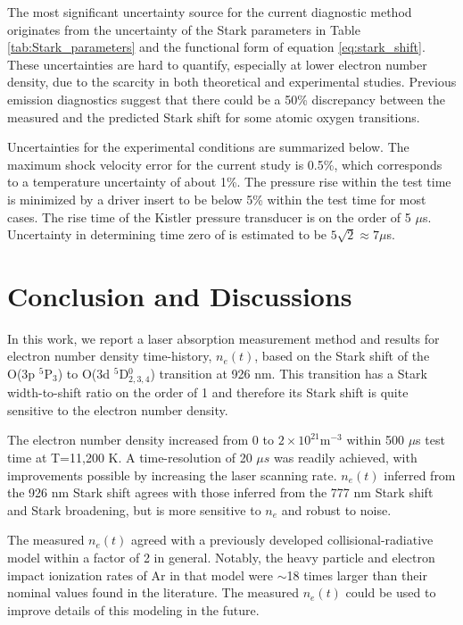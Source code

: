 \documentclass[12pt]{iopart}
\begin{document}
The most significant uncertainty source for the current diagnostic method originates from  the uncertainty of the Stark parameters in Table \ref{tab:Stark_parameters} and the functional form of equation \ref{eq:stark_shift}. These uncertainties are hard to quantify, especially at lower electron number density, due to the scarcity in both theoretical and experimental studies. Previous emission diagnostics suggest that there could be a 50\% discrepancy between the measured and the predicted Stark shift for some atomic oxygen transitions\cite{Baer1993_semiconductor, Goly1987}. 

Uncertainties for the experimental conditions are summarized below. The maximum shock velocity error for the current study is 0.5\%, which corresponds to a temperature uncertainty of about 1\%.  The pressure rise within the test time is minimized by a driver insert to be below 5\% within the test time for most cases. The rise time of the Kistler pressure transducer is on the order of  5 $\mu$s. Uncertainty in  determining time zero of is estimated to be $5\sqrt{2}\approx 7 \mu$s.


\section{Conclusion and Discussions}
In this work, we report a laser absorption measurement method and results for electron number density time-history, $n_e(t)$, based on the Stark shift of the O(3p $^5$P$_{3}$) to O(3d $^5$D$_{2,3,4}^0$) transition at 926 nm. This transition has a Stark width-to-shift ratio on the order of 1 and therefore its Stark shift is quite sensitive to the electron number density. 

The electron number density increased from 0 to $2\times10^{21}$m$^{-3}$ within 500 $\mu$s test time at T=11,200 K. A time-resolution of 20 $\mu s$ was readily achieved, with improvements possible by increasing the laser scanning rate. $n_e(t)$ inferred from the 926 nm Stark shift agrees with those inferred from the 777 nm Stark shift and Stark broadening, but is more sensitive to $n_e$ and robust to noise.

The measured $n_e(t)$ agreed with a previously developed collisional-radiative model\cite{Li2019_modeling} within a factor of 2 in general. Notably, the heavy particle and electron impact ionization rates of Ar in that model were $\sim$18 times larger than their nominal values found in the literature. The measured $n_e(t)$ could be used to improve details of this modeling in the future.
\end{document}
